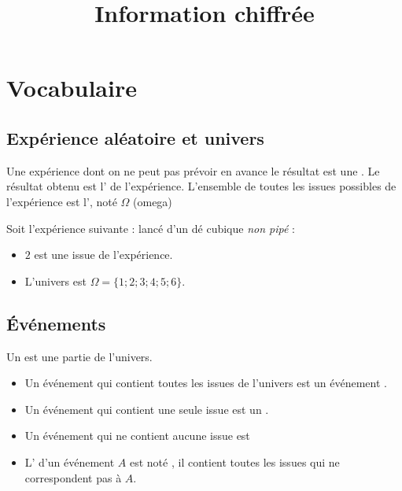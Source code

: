 \documentclass[12pt,a4paper]{article}
\date{}
\title{Information chiffrée }
\begin{document}




\section{Vocabulaire}

\subsection{Expérience aléatoire et univers}

\begin{mydefs}
 Une expérience dont on ne peut pas prévoir en avance le résultat est une . Le résultat obtenu est l' de l'expérience. L'ensemble de toutes les issues possibles de l'expérience est l', noté $\Omega$ (omega)
\end{mydefs}

\begin{myex}
	Soit l'expérience suivante : lancé d'un dé cubique \textit{non pipé} :
	\begin{itemize}
		\item $2$ est une issue de l'expérience.
		\item L'univers est $\Omega = \{1 ; 2 ; 3 ; 4 ; 5 ; 6\}$.
	\end{itemize}
\end{myex}

\subsection{\'Evénements}

\begin{mydefs}
	Un  est une partie de l'univers. 
	\begin{itemize}
		\item Un événement qui contient toutes les issues de l'univers est un événement .
		\item Un événement qui contient une seule issue est un .
		\item Un événement qui ne contient aucune issue est 
		\item L' d'un événement $A$ est noté , il contient toutes les issues qui ne correspondent pas à $A$.
	\end{itemize}
\end{mydefs}
\end{document}
